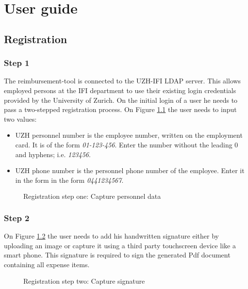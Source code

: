 \chapter{User guide}

\section{Registration}
\label{sec:registration}

\subsection{Step 1}
The reimbursement-tool is connected to the UZH-IFI LDAP server. This allows employed persons at the IFI department to use their existing login credentials provided by the University of Zurich.\newline
On the initial login of a user he needs to pass a two-stepped registration process. On Figure \ref{fig:registration-step01} the user needs to input two values:
\begin{itemize}
    \item UZH personnel number is the employee number, written on the employment card. It is of the form \textit{01-123-456}. Enter the number without the leading 0 and hyphens; i.e. \textit{123456}.
    \item UZH phone number is the personnel phone number of the employee. Enter it in the form in the form \textit{0441234567}.
\end{itemize}


\begin{figure}[H]
    \centering
    \caption{Registration step one: Capture personnel data}
    \label{fig:registration-step01}
\end{figure}

\subsection{Step 2}
On Figure \ref{fig:registration-step02} the user needs to add his handwritten signature either by uploading an image or capture it using a third party touchscreen device like a smart phone. This signature is required to sign the generated Pdf document containing all expense items.  

\begin{figure}[H]
    \centering
    \caption{Registration step two: Capture signature}
    \label{fig:registration-step02}
\end{figure}


